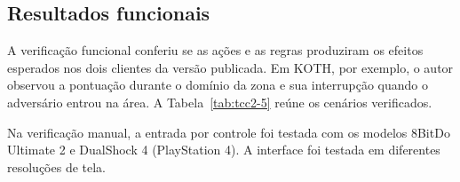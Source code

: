 \subsection{Resultados funcionais}\label{sec:5.3.1}

A verificação funcional conferiu se as ações e as regras produziram os efeitos esperados nos dois clientes da versão publicada. Em KOTH, por exemplo, o autor observou a pontuação durante o domínio da zona e sua interrupção quando o adversário entrou na área. A Tabela~\ref{tab:tcc2-5} reúne os cenários verificados.

Na verificação manual, a entrada por controle foi testada com os modelos 8BitDo Ultimate 2 e DualShock 4 (PlayStation 4). A interface foi testada em diferentes resoluções de tela.

\begingroup
\small
\setlength{\tabcolsep}{4pt}
\renewcommand{\arraystretch}{1.18}
